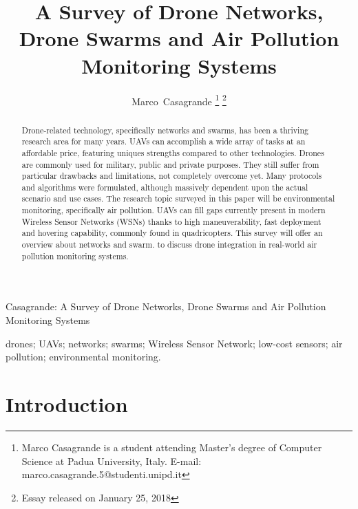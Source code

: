 \documentclass[journal]{IEEEtran}
\begin{document}
\title{A Survey of Drone Networks, Drone Swarms and Air Pollution Monitoring Systems}

\author{Marco~Casagrande
\thanks{Marco Casagrande is a student attending Master's degree of Computer Science at Padua University, Italy. E-mail: marco.casagrande.5@studenti.unipd.it}
\thanks{Essay released on January 25, 2018}}


{Casagrande: A Survey of Drone Networks, Drone Swarms and Air Pollution Monitoring Systems}

\maketitle

\begin{abstract}
Drone-related technology, specifically networks and swarms, has been a thriving research area for many years. UAVs can accomplish a wide array of tasks at an affordable price, featuring uniques strengths compared to other technologies. Drones are commonly used for military, public and private purposes. They still suffer from particular drawbacks and limitations, not completely overcome yet. Many protocols and algorithms were formulated, although massively dependent upon the actual scenario and use cases. The research topic surveyed in this paper will be environmental monitoring, specifically air pollution. UAVs can fill gaps currently present in modern Wireless Sensor Networks (WSNs) thanks to high maneuverability, fast deployment and hovering capability, commonly found in quadricopters. This survey will offer an overview about networks and swarm. to discuss drone integration in real-world air pollution monitoring systems.
\end{abstract}

\begin{IEEEkeywords}
drones; UAVs; networks; swarms; Wireless Sensor Network; low-cost sensors; air pollution; environmental monitoring.
\end{IEEEkeywords}

\IEEEpeerreviewmaketitle



\section{Introduction}
\end{document}

